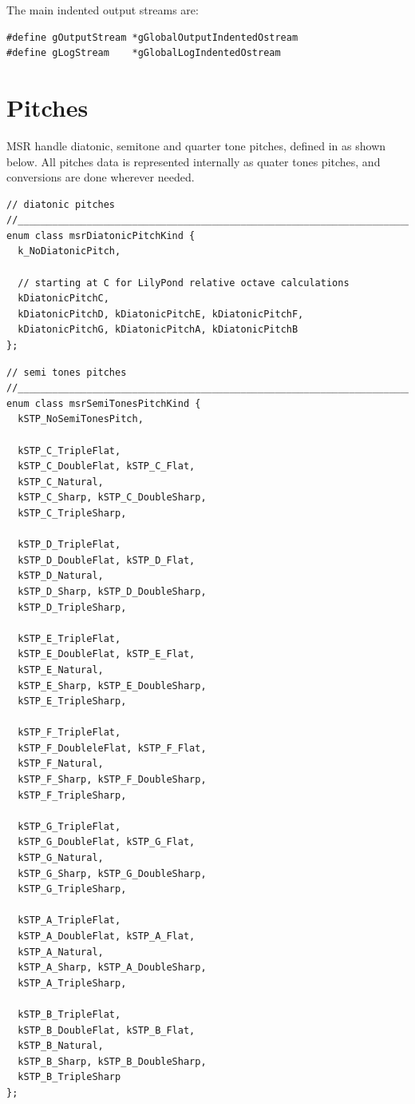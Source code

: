 The main indented output streams are:
\begin{lstlisting}[language=CPlusPlus]
#define gOutputStream *gGlobalOutputIndentedOstream
#define gLogStream    *gGlobalLogIndentedOstream

\end{lstlisting}


\section{Pitches}\label{Pitches}

MSR handle diatonic, semitone and quarter tone pitches, defined in  as shown below.
All pitches data is represented internally as quater tones pitches, and conversions are done wherever needed.

\begin{lstlisting}[language=CPlusPlus]
// diatonic pitches
//______________________________________________________________________________
enum class msrDiatonicPitchKind {
  k_NoDiatonicPitch,

  // starting at C for LilyPond relative octave calculations
  kDiatonicPitchC,
  kDiatonicPitchD, kDiatonicPitchE, kDiatonicPitchF,
  kDiatonicPitchG, kDiatonicPitchA, kDiatonicPitchB
};
\end{lstlisting}

\begin{lstlisting}[language=CPlusPlus]
// semi tones pitches
//______________________________________________________________________________
enum class msrSemiTonesPitchKind {
  kSTP_NoSemiTonesPitch,

  kSTP_C_TripleFlat,
  kSTP_C_DoubleFlat, kSTP_C_Flat,
  kSTP_C_Natural,
  kSTP_C_Sharp, kSTP_C_DoubleSharp,
  kSTP_C_TripleSharp,

  kSTP_D_TripleFlat,
  kSTP_D_DoubleFlat, kSTP_D_Flat,
  kSTP_D_Natural,
  kSTP_D_Sharp, kSTP_D_DoubleSharp,
  kSTP_D_TripleSharp,

  kSTP_E_TripleFlat,
  kSTP_E_DoubleFlat, kSTP_E_Flat,
  kSTP_E_Natural,
  kSTP_E_Sharp, kSTP_E_DoubleSharp,
  kSTP_E_TripleSharp,

  kSTP_F_TripleFlat,
  kSTP_F_DoubleleFlat, kSTP_F_Flat,
  kSTP_F_Natural,
  kSTP_F_Sharp, kSTP_F_DoubleSharp,
  kSTP_F_TripleSharp,

  kSTP_G_TripleFlat,
  kSTP_G_DoubleFlat, kSTP_G_Flat,
  kSTP_G_Natural,
  kSTP_G_Sharp, kSTP_G_DoubleSharp,
  kSTP_G_TripleSharp,

  kSTP_A_TripleFlat,
  kSTP_A_DoubleFlat, kSTP_A_Flat,
  kSTP_A_Natural,
  kSTP_A_Sharp, kSTP_A_DoubleSharp,
  kSTP_A_TripleSharp,

  kSTP_B_TripleFlat,
  kSTP_B_DoubleFlat, kSTP_B_Flat,
  kSTP_B_Natural,
  kSTP_B_Sharp, kSTP_B_DoubleSharp,
  kSTP_B_TripleSharp
};
\end{lstlisting}

